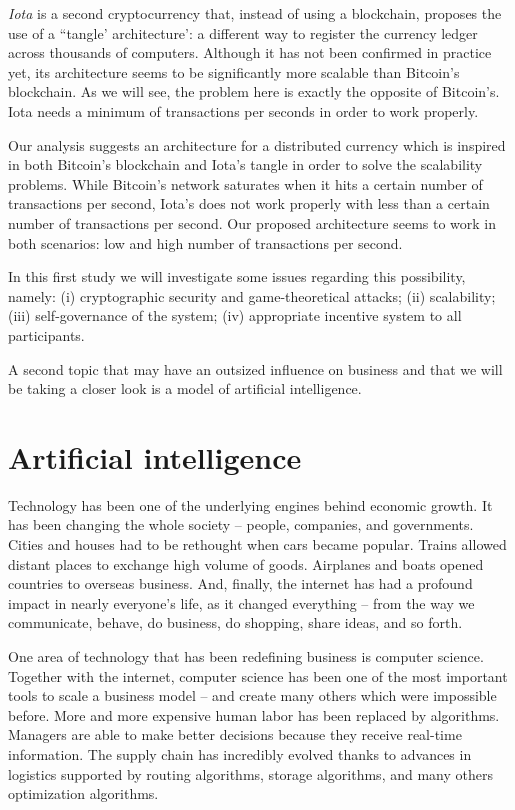 \emph{Iota} is a second cryptocurrency that, instead of using a blockchain, proposes the use of a ``tangle' architecture': a different way to register the currency ledger across thousands of computers. Although it has not been confirmed in practice yet, its architecture seems to be significantly more scalable than Bitcoin's blockchain. As we will see, the problem here is exactly the opposite of Bitcoin's. Iota needs a minimum of transactions per seconds in order to work properly.

Our analysis suggests an architecture for a distributed currency which is inspired in both Bitcoin's blockchain and Iota's tangle in order to solve the scalability problems. While Bitcoin's network saturates when it hits a certain number of transactions per second, Iota's does not work properly with less than a certain number of transactions per second. Our proposed architecture seems to work in both scenarios: low and high number of transactions per second.

In this first study we will investigate some issues regarding this possibility, namely: (i) cryptographic security and game-theoretical attacks; (ii) scalability; (iii) self-governance of the system; (iv) appropriate incentive system to all participants.

A second topic that may have an outsized influence on business and that we will be taking a closer look is a model of artificial intelligence.

\section{Artificial intelligence}

Technology has been one of the underlying engines behind economic growth. It has been changing the whole society -- people, companies, and governments. Cities and houses had to be rethought when cars became popular. Trains allowed distant places to exchange high volume of goods. Airplanes and boats opened countries to overseas business. And, finally, the internet has had a profound impact in nearly everyone's life, as it changed everything -- from the way we communicate, behave, do business, do shopping, share ideas, and so forth.

One area of technology that has been redefining business is computer science. Together with the internet, computer science has been one of the most important tools to scale a business model -- and create many others which were impossible before. More and more expensive human labor has been replaced by algorithms. Managers are able to make better decisions because they receive real-time information. The supply chain has incredibly evolved thanks to advances in logistics supported by routing algorithms, storage algorithms, and many others optimization algorithms.

